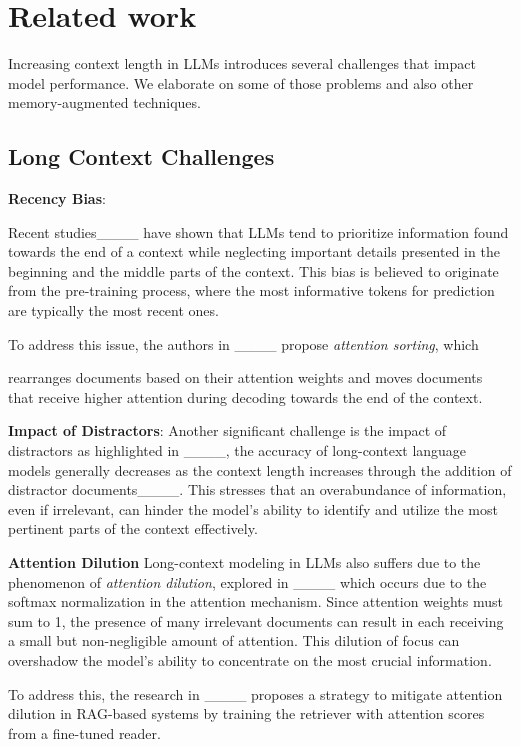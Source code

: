 \section{Related work}
\label{sec:related_work}

Increasing context length in LLMs introduces several challenges that impact model performance. We elaborate on some of those problems and also other memory-augmented techniques. 

\subsection{Long Context Challenges}
\textbf{Recency Bias}: 

Recent studies____ have shown that LLMs tend to prioritize information found towards the end of a context while neglecting important details presented in the beginning and the middle parts of the context. 
This bias is believed to originate from the pre-training process, where the most informative tokens for prediction are typically the most recent ones. 

To address this issue, the authors in ____ propose \textit{attention sorting}, which

rearranges documents based on their attention weights and moves documents that receive higher attention during decoding towards the end of the context.


\textbf{Impact of Distractors}: 
Another significant challenge is the impact of distractors as highlighted in ____, the accuracy of long-context language models generally decreases as the context length increases through the addition of distractor documents____. This stresses that an overabundance of information, even if irrelevant, can hinder the model's ability to identify and utilize the most pertinent parts of the context effectively.

\textbf{Attention Dilution}
Long-context modeling in LLMs also suffers due to the phenomenon of \textit{attention dilution}, explored in ____ which occurs due to the softmax normalization in the attention mechanism. Since attention weights must sum to 1, the presence of many irrelevant documents can result in each receiving a small but non-negligible amount of attention. This dilution of focus can overshadow the model's ability to concentrate on the most crucial information.

To address this, the research in ____ proposes a strategy to mitigate attention dilution in RAG-based systems by training the retriever with attention scores from a fine-tuned reader. 

